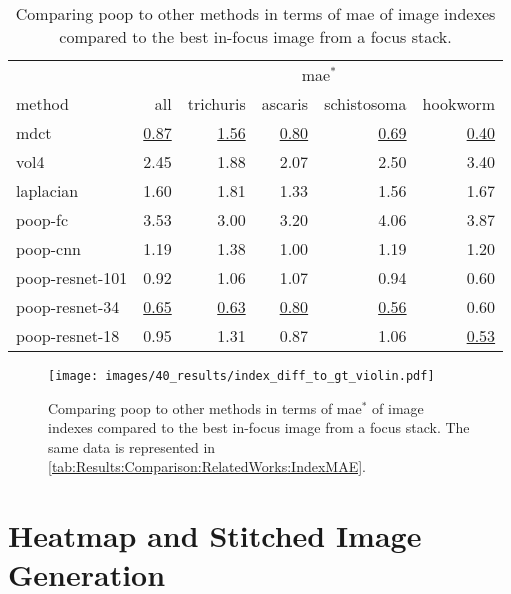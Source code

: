 \begin{table}
    \centering
    \caption{Comparing \acs{poop} to other methods in terms of \ac{mae} of image indexes compared to the best in-focus image from a focus stack.}
    \begin{tabular}{lrrrrr}
        \hline
        \multicolumn{1}{c}{} & \multicolumn{5}{c}{\ac{mae}$^*$} \\
        \cline{2-6}
        method & all & trichuris & ascaris & schistosoma & hookworm \\
        \hline
        \acs{mdct}      & \underline{0.87} & \underline{1.56} & \underline{0.80} & \underline{0.69} & \underline{0.40} \\
        \acs{vol4}      & 2.45 & 1.88 & 2.07 & 2.50 & 3.40 \\
        \acs{laplacian} & 1.60 & 1.81 & 1.33 & 1.56 & 1.67 \\
        \hline
        \acs{poop}-\acs{fc}              & 3.53 & 3.00 & 3.20 & 4.06 & 3.87 \\
        \acs{poop}-\acs{cnn}             & 1.19 & 1.38 & 1.00 & 1.19 & 1.20 \\
        \acs{poop}-\acs{resnet}-101      & 0.92 & 1.06 & 1.07 & 0.94 & 0.60 \\
        \acs{poop}-\acs{resnet}-34       & \underline{0.65} & \underline{0.63} & \underline{0.80} & \underline{0.56} & 0.60 \\
        \acs{poop}-\acs{resnet}-18       & 0.95 & 1.31 & 0.87 & 1.06 & \underline{0.53} \\
    \end{tabular}
    \label{tab:Results:Comparison:RelatedWorks:IndexMAE}
\end{table}

\begin{figure}
    \centering
    \texttt{[image: images/40\_results/index\_diff\_to\_gt\_violin.pdf]}
    \caption{Comparing \acs{poop} to other methods in terms of \ac{mae}$^*$ of image indexes compared to the best in-focus image from a focus stack. The same data is represented in \autoref{tab:Results:Comparison:RelatedWorks:IndexMAE}.}
    \label{fig:Results:Comparison:RelatedWorks:IndexMAE}
\end{figure}


\section{Heatmap and Stitched Image Generation}
\label{sec:Results:HeatStiched}

